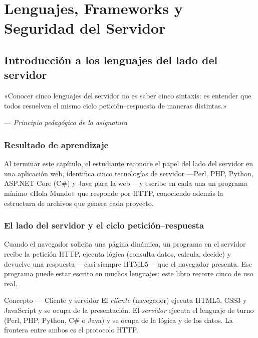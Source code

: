 \part{Lenguajes, Frameworks y Seguridad del Servidor}

\chapter{Introducción a los lenguajes del lado del servidor}
\label{cap:lenguajes}

\epigraph{«Conocer cinco lenguajes del servidor no es saber cinco
sintaxis: es entender que todos resuelven el mismo ciclo
petición--respuesta de maneras distintas.»}{--- \textit{Principio
pedagógico de la asignatura}}

\section*{Resultado de aprendizaje}
Al terminar este capítulo, el estudiante reconoce el papel del lado del
servidor en una aplicación web, identifica cinco tecnologías de servidor
---Perl, PHP, Python, ASP.NET Core (C\#) y Java para la web--- y escribe
en cada una un programa mínimo «Hola Mundo» que responde por HTTP,
conociendo además la estructura de archivos que genera cada proyecto.

\section{El lado del servidor y el ciclo petición--respuesta}
\label{sec:cap5:ciclo}

Cuando el navegador solicita una página dinámica, un programa en el
servidor recibe la petición HTTP, ejecuta lógica (consulta datos,
calcula, decide) y devuelve una respuesta ---casi siempre HTML5--- que
el navegador presenta. Ese programa puede estar escrito en muchos
lenguajes; este libro recorre cinco de uso real.

\begin{cajadefinicion}{Concepto --- Cliente y servidor}
El \emph{cliente} (navegador) ejecuta HTML5, CSS3 y JavaScript y se
ocupa de la presentación. El \emph{servidor} ejecuta el lenguaje de
turno (Perl, PHP, Python, C\# o Java) y se ocupa de la lógica y de los
datos. La frontera entre ambos es el protocolo HTTP.
\end{cajadefinicion}

